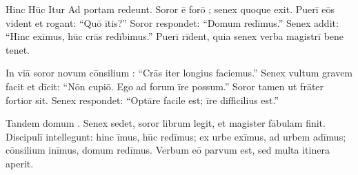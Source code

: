 \documentclass[12pt]{nextbook}
\begin{document}
\begin{readersection}{Hinc Hūc Itur}
Ad portam redeunt. Soror ē forō ; senex quoque exit. Puerī eōs vident et rogant: “Quō ītis?” Soror respondet: “Domum redīmus.” Senex addit: “Hinc exīmus, hūc crās redībimus.” Puerī rīdent, quia senex verba magistrī bene tenet.

In viā soror novum cōnsilium : “Crās iter longius faciemus.” Senex vultum gravem facit et dīcit: “Nōn cupiō. Ego  ad forum īre possum.” Soror tamen  ut frāter fortior sit. Senex respondet: “Optāre facile est; īre difficilius est.”

Tandem domum . Senex sedet, soror librum legit, et magister fābulam finit. Discipulī intellegunt: hinc īmus, hūc redīmus; ex urbe exīmus, ad urbem adīmus; cōnsilium inīmus, domum redīmus. Verbum eō parvum est, sed multa itinera aperit.

\end{readersection}
\end{document}
